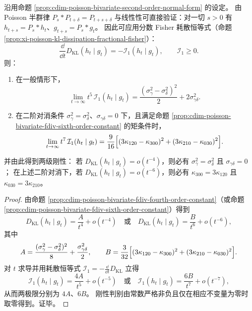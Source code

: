 \begin{proposition}\label{prop:cdim-poisson-bivariate-entropy-dissipation-asymptotics-rigidity}
沿用命题 \ref{prop:cdim-poisson-bivariate-second-order-normal-form} 的设定。
由 Poisson 半群律 \(P_s*P_{t+\delta}=P_{t+s+\delta}\) 与线性性可直接验证：对一切 \(s>0\) 有 \(h_{t+s}=P_s*h_t\)、\(g_{t+s}=P_s*g_t\)。
因此可应用分数 Fisher 耗散恒等式（命题 \ref{prop:xi-poisson-kl-dissipation-fractional-fisher}）：
\[
\frac{\dd}{\dd t}D_{\mathrm{KL}}(h_t\mid g_t)=-\mathcal I_1(h_t\mid g_t),
\qquad \mathcal I_1\ge 0.
\]
则：
\begin{enumerate}
  \item 在一般情形下，
  \[
  \lim_{t\to\infty}t^5\,\mathcal I_1(h_t\mid g_t)
  =
  \frac{(\sigma_\gamma^2-\sigma_\delta^2)^2}{2}+2\sigma_{\gamma\delta}^2.
  \]
  \item 在二阶对消条件 \(\sigma_\gamma^2=\sigma_\delta^2\)、\(\sigma_{\gamma\delta}=0\) 下，且满足命题 \ref{prop:cdim-poisson-bivariate-fdiv-sixth-order-constant} 的矩条件时，
  \[
  \lim_{t\to\infty}t^7\,\mathcal I_1(h_t\mid g_t)
  =
  \frac{9}{16}\Bigl[(3\kappa_{120}-\kappa_{300})^2+(3\kappa_{210}-\kappa_{030})^2\Bigr].
  \]
\end{enumerate}
并由此得到两级刚性：
若 \(D_{\mathrm{KL}}(h_t\mid g_t)=o(t^{-4})\)，则必有 \(\sigma_\gamma^2=\sigma_\delta^2\) 且 \(\sigma_{\gamma\delta}=0\)；
在上述二阶对消下，若 \(D_{\mathrm{KL}}(h_t\mid g_t)=o(t^{-6})\)，则必有 \(\kappa_{300}=3\kappa_{120}\) 且 \(\kappa_{030}=3\kappa_{210}\)。
\end{proposition}
\begin{proof}
由命题 \ref{prop:cdim-poisson-bivariate-fdiv-fourth-order-constant}（或命题 \ref{prop:cdim-poisson-bivariate-fdiv-sixth-order-constant}）得到
\[
D_{\mathrm{KL}}(h_t\mid g_t)=\frac{A}{t^4}+o(t^{-4})
\quad\text{或}\quad
D_{\mathrm{KL}}(h_t\mid g_t)=\frac{B}{t^6}+o(t^{-6}),
\]
其中
\[
A=\frac{(\sigma_\gamma^2-\sigma_\delta^2)^2}{8}+\frac{\sigma_{\gamma\delta}^2}{2},
\qquad
B=\frac{3}{32}\Bigl[(3\kappa_{120}-\kappa_{300})^2+(3\kappa_{210}-\kappa_{030})^2\Bigr].
\]
对 \(t\) 求导并用耗散恒等式 \(\mathcal I_1=-\frac{\dd}{\dd t}D_{\mathrm{KL}}\) 立得
\[
\mathcal I_1(h_t\mid g_t)=\frac{4A}{t^5}+o(t^{-5})
\quad\text{或}\quad
\mathcal I_1(h_t\mid g_t)=\frac{6B}{t^7}+o(t^{-7}),
\]
从而两极限分别为 \(4A\)、\(6B\)。
刚性判别由常数严格非负且仅在相应不变量为零时取零得到。证毕。
\end{proof}

